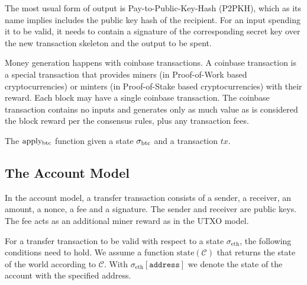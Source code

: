 The most usual form of output is Pay-to-Public-Key-Hash (P2PKH), which as its name implies includes the public key hash of the recipient. For an input spending it to be valid, it needs to contain a signature of the corresponding secret key over the new transaction skeleton and the output to be spent.

Money generation happens with coinbase transactions. A coinbase transaction is a special transaction that provides miners (in Proof-of-Work based cryptocurrencies) or minters (in Proof-of-Stake based cryptocurrencies) with their reward. Each block may have a single coinbase transaction. The coinbase transaction contains no inputs and generates only as much value as is considered the block reward per the consensus rules, plus any transaction fees.

\begin{algorithm}[H]
    \caption{\label{alg.btcapply} The $\text{apply}\textsubscript{btc}$ function given a state $\btcstate$ and a transaction $tx$.}
    \begin{algorithmic}[1]
            \EndFor
            \EndFor
            \State\Return{$\btcstate$}
        \EndFunction
    \end{algorithmic}
\end{algorithm}

\subsection{The Account Model}
In the account model, a transfer transaction consists of a sender, a receiver, an amount, a nonce, a fee and a signature. The sender and receiver are public keys. The fee acts as an additional miner reward as in the UTXO model.

\def\state{\text{state}}
\def\chain{\ensuremath{\mathcal{C}}}
\def\sender{\texttt{sender}}
\def\receiver{\texttt{receiver}}
\def\amount{\texttt{amount}}
\def\fee{\texttt{fee}}
\def\nonce{\text{nonce}}
\def\bal{\text{balance}}
\def\ethstate{\ensuremath{\sigma_\text{eth}}}
For a transfer transaction to be valid with respect to a state $\ethstate$, the following conditions need to hold. We assume a function $\state(\chain)$ that returns the state of the world according to $\chain$. With $\ethstate[\texttt{address}]$ we denote the state of the account with the specified address.

